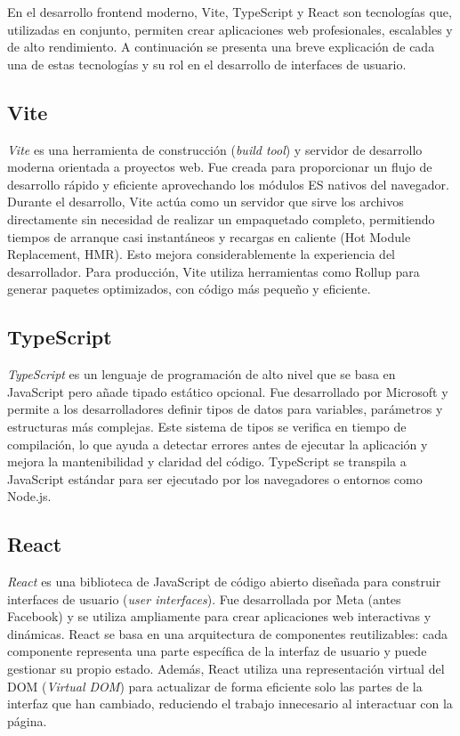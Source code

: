 \documentclass{article}
\begin{document}
En el desarrollo frontend moderno, Vite, TypeScript y React son tecnologías que, utilizadas en conjunto, permiten crear aplicaciones web profesionales, escalables y de alto rendimiento. A continuación se presenta una breve explicación de cada una de estas tecnologías y su rol en el desarrollo de interfaces de usuario.

\subsection{Vite}

\textit{Vite} es una herramienta de construcción (\textit{build tool}) y servidor de desarrollo moderna orientada a proyectos web. Fue creada para proporcionar un flujo de desarrollo rápido y eficiente aprovechando los módulos ES nativos del navegador. Durante el desarrollo, Vite actúa como un servidor que sirve los archivos directamente sin necesidad de realizar un empaquetado completo, permitiendo tiempos de arranque casi instantáneos y recargas en caliente (Hot Module Replacement, HMR). Esto mejora considerablemente la experiencia del desarrollador. Para producción, Vite utiliza herramientas como Rollup para generar paquetes optimizados, con código más pequeño y eficiente.

\subsection{TypeScript}

\textit{TypeScript} es un lenguaje de programación de alto nivel que se basa en JavaScript pero añade tipado estático opcional. Fue desarrollado por Microsoft y permite a los desarrolladores definir tipos de datos para variables, parámetros y estructuras más complejas. Este sistema de tipos se verifica en tiempo de compilación, lo que ayuda a detectar errores antes de ejecutar la aplicación y mejora la mantenibilidad y claridad del código. TypeScript se transpila a JavaScript estándar para ser ejecutado por los navegadores o entornos como Node.js.

\subsection{React}

\textit{React} es una biblioteca de JavaScript de código abierto diseñada para construir interfaces de usuario (\textit{user interfaces}). Fue desarrollada por Meta (antes Facebook) y se utiliza ampliamente para crear aplicaciones web interactivas y dinámicas. React se basa en una arquitectura de componentes reutilizables: cada componente representa una parte específica de la interfaz de usuario y puede gestionar su propio estado. Además, React utiliza una representación virtual del DOM (\textit{Virtual DOM}) para actualizar de forma eficiente solo las partes de la interfaz que han cambiado, reduciendo el trabajo innecesario al interactuar con la página.
\end{document}
